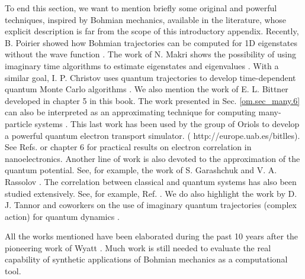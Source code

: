 \documentclass[onecolumn,nofootinbib, secnumarabic, amsmath, nobibnotes,11pt,aps,pra]{revtex4-1}
\newcommand{\sref}[1]{Sec. \ref{#1}}
\begin{document}
To end this section, we want to mention briefly some original and
powerful techniques, inspired by Bohmian mechanics, available in the
literature, whose explicit description is far from the scope of this
introductory appendix. Recently, B. Poirier showed how Bohmian
trajectories can be computed for 1D eigenstates without the wave
function \cite{om.poirier}. The work of N. Makri shows the possibility of using
imaginary time algorithms to estimate eigenstates and eigenvalues
\cite{om.imaginarytime}. With a similar goal, I. P. Christov uses
quantum trajectories to develop time-dependent quantum Monte Carlo
algorithms \cite{om.ivan,om.ivan2}. We also mention the work of E.
L. Bittner \cite{om.extra16} developed in chapter 5 in this book.
The work presented in \sref{om.sec_many.6} can also be interpreted as an
approximating technique for computing many-particle systems
\cite{om.oriolsprl}. This last work has been used by the group of
Oriols to develop a powerful quantum electron transport simulator. (
http://europe.uab.es/bitlles). See Refs.
\cite{om.oriolsexample1,om.oriolsexample2} or chapter 6 for
practical results on electron correlation in nanoelectronics.
Another line of work is also devoted to the approximation of the
quantum potential. See, for example, the work of S. Garashchuk and
V. A. Rassolov \cite{om.gara}. The correlation between classical and
quantum systems has also been studied extensively. See, for example,
Ref. \cite{om.extra13}. We do also highlight the work by D. J.
Tannor and coworkers on the use of imaginary quantum trajectories
(complex action) for quantum dynamics
\cite{om.imaginaryaction,om.imaginaryactionprl}.

All the works mentioned have been elaborated during the past 10
years after the pioneering work of Wyatt
\cite{om.Wyatt1,om.extra17}. Much work is still needed to evaluate
the real capability of synthetic applications of Bohmian mechanics
as a computational tool.%
\end{document}
